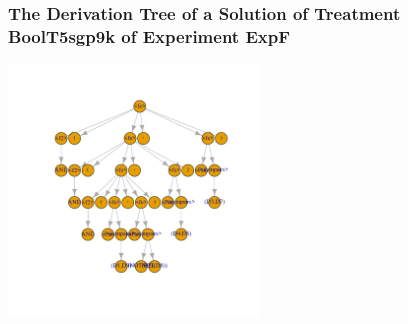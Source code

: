  \begin{frame}
 \frametitle{ The Derivation Tree of a Solution of Treatment BoolT5sgp9k of Experiment ExpF }
 \begin{center}
\includegraphics[width=0.5\textwidth, angle=0]
{ExpFDerivationTreeFigure010.pdf}
 \end{center}
 \label{report/ExpFDerivationTreeFigure010.pdf}  
 \end{frame}

